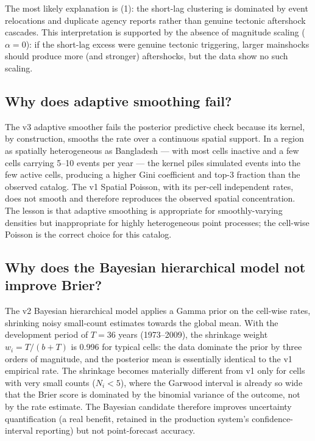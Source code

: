 \documentclass[10pt,a4paper,twocolumn]{article}
\begin{document}
The most likely explanation is (1): the short-lag clustering is dominated by event relocations and duplicate agency reports rather than genuine tectonic aftershock cascades. This interpretation is supported by the absence of magnitude scaling ($\alpha=0$): if the short-lag excess were genuine tectonic triggering, larger mainshocks should produce more (and stronger) aftershocks, but the data show no such scaling.

\subsection{Why does adaptive smoothing fail?}

The v3 adaptive smoother fails the posterior predictive check because its kernel, by construction, smooths the rate over a continuous spatial support. In a region as spatially heterogeneous as Bangladesh --- with most cells inactive and a few cells carrying 5--10 events per year --- the kernel piles simulated events into the few active cells, producing a higher Gini coefficient and top-3 fraction than the observed catalog. The v1 Spatial Poisson, with its per-cell independent rates, does not smooth and therefore reproduces the observed spatial concentration. The lesson is that adaptive smoothing is appropriate for smoothly-varying densities but inappropriate for highly heterogeneous point processes; the cell-wise Poisson is the correct choice for this catalog.

\subsection{Why does the Bayesian hierarchical model not improve Brier?}

The v2 Bayesian hierarchical model applies a Gamma prior on the cell-wise rates, shrinking noisy small-count estimates towards the global mean. With the development period of $T=36$ years (1973--2009), the shrinkage weight $w_i = T/(b+T)$ is 0.996 for typical cells: the data dominate the prior by three orders of magnitude, and the posterior mean is essentially identical to the v1 empirical rate. The shrinkage becomes materially different from v1 only for cells with very small counts ($N_i<5$), where the Garwood interval is already so wide that the Brier score is dominated by the binomial variance of the outcome, not by the rate estimate. The Bayesian candidate therefore improves uncertainty quantification (a real benefit, retained in the production system's confidence-interval reporting) but not point-forecast accuracy.
\end{document}
